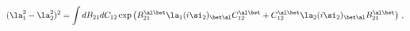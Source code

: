 \begin{equation}
(\la_{1}^2 - \la_{2}^2)^2 = \int dB_{2 1} dC_{1 2} \exp\left( B_{2 1}^{\al%
\bet}\la_{1}(i\si_2)_{\bet\al}C_{1 2}^{\al\bet} + C_{1 2}^{\al\bet}\la_{2}(i%
\si_2)_{\bet\al} B_{2 1}^{\al\bet} \right)\, ,
\end{equation}

